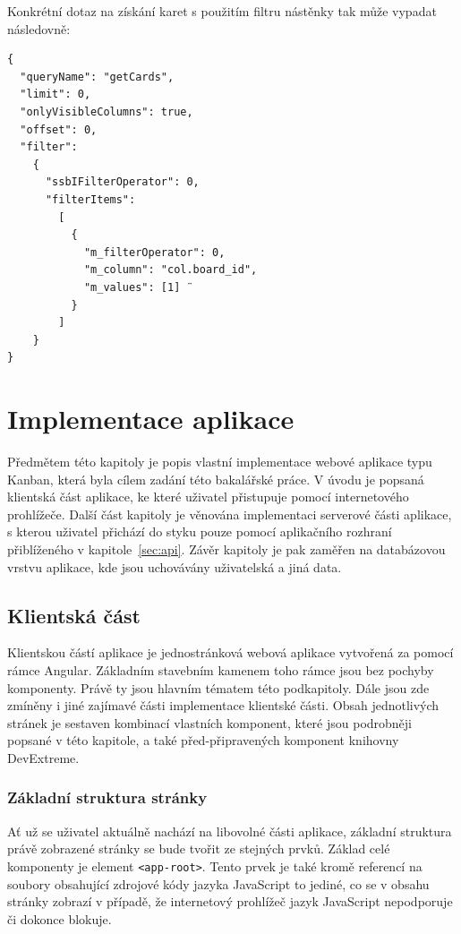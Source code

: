 Konkrétní dotaz na získání karet s použitím filtru nástěnky tak může vypadat následovně:

\begin{verbatim}
{
  "queryName": "getCards",
  "limit": 0,
  "onlyVisibleColumns": true,
  "offset": 0,
  "filter":
    {
      "ssbIFilterOperator": 0,
      "filterItems":
        [
          {
            "m_filterOperator": 0,
            "m_column": "col.board_id",
            "m_values": [1] ¨
          }
        ]
    }
}
\end{verbatim}

\chapter{Implementace aplikace}
Předmětem této kapitoly je popis vlastní implementace webové aplikace typu Kanban, která byla cílem zadání této bakalářské práce. V úvodu je popsaná klientská část aplikace, ke které uživatel přistupuje pomocí internetového prohlížeče. Další část kapitoly je věnována implementaci serverové části aplikace, s kterou uživatel přichází do styku pouze pomocí aplikačního rozhraní přiblíženého v kapitole~\ref{sec:api}. Závěr kapitoly je pak zaměřen na databázovou vrstvu aplikace, kde jsou uchovávány uživatelská a jiná data.

\section{Klientská část}

Klientskou částí aplikace je jednostránková webová aplikace vytvořená za pomocí rámce Angular. Základním stavebním kamenem toho rámce jsou bez pochyby komponenty. Právě ty jsou hlavním tématem této podkapitoly. Dále jsou zde zmíněny i jiné zajímavé části implementace klientské části. Obsah jednotlivých stránek je sestaven kombinací vlastních komponent, které jsou podrobněji popsané v této kapitole, a také před-připravených komponent knihovny DevExtreme.

\subsection{Základní struktura stránky}
Ať už se uživatel aktuálně nachází na libovolné části aplikace, základní struktura právě zobrazené stránky se bude tvořit ze stejných prvků. Základ celé komponenty je element \texttt{<app-root>}. Tento prvek je také kromě referencí na soubory obsahující zdrojové kódy jazyka JavaScript to jediné, co se v obsahu stránky zobrazí v případě, že internetový prohlížeč jazyk JavaScript nepodporuje či dokonce blokuje. 

